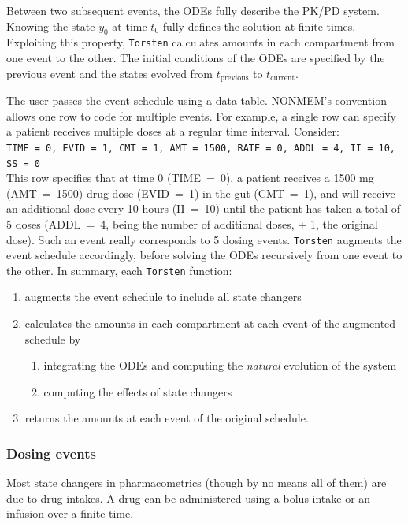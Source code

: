 \documentclass[11pt]{article}
\begin{document}
Between two subsequent events, the ODEs fully describe the PK/PD system. Knowing 
the state $y_0$ at time $t_0$ fully defines the solution at finite times. Exploiting this 
property, \texttt{Torsten} calculates amounts in each compartment from one event to the other.
 The initial conditions of the ODEs are specified by the previous event and the states 
 evolved from $t_\mathrm{previous}$ to $t_\mathrm{current}$.

The user passes the event schedule using a data table. 
%
NONMEM's convention allows one row to code for multiple events. For example, a 
single row can specify a patient receives multiple doses at a regular time interval. Consider: \\
%
\texttt{TIME = 0, EVID = 1, CMT = 1, AMT = 1500, RATE = 0, ADDL = 4, II = 10, SS = 0} \\
%
This row specifies that at time 0 (\hbox{TIME = 0}), a patient receives a 1500 mg 
(\hbox{AMT = 1500}) drug dose (\hbox{EVID = 1}) in the gut (\hbox{CMT = 1}), and will 
receive an additional dose every 10 hours (\hbox{II = 10}) until the patient has taken a 
total of 5 doses (\hbox{ADDL = 4}, being the number of additional doses, + 1, the original 
dose). Such an event really corresponds to 5 dosing events. \texttt{Torsten} augments the event 
schedule accordingly, before solving the ODEs recursively from one event to the other.
%
In summary, each \texttt{Torsten} function:
\begin{enumerate}
  \item augments the event schedule to include all state changers
  \item calculates the amounts in each compartment at each event of the augmented schedule by
  \begin{enumerate}
    \item integrating the ODEs and computing the \textit{natural} evolution of the system
    \item computing the effects of state changers
  \end{enumerate}
  \item returns the amounts at each event of the original schedule.
\end{enumerate}

\subsubsection{Dosing events}

Most state changers in pharmacometrics (though by no means all of them) are due to drug
intakes. A drug can be administered using a bolus intake or an infusion over a finite time.
\end{document}
